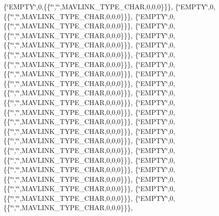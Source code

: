 \{\char`\"{}E\+M\+P\+TY\char`\"{},0,\{\{\char`\"{}\char`\"{},\char`\"{}\char`\"{},M\+A\+V\+L\+I\+N\+K\+\_\+\+T\+Y\+P\+E\+\_\+\+C\+H\+AR,0,0,0\}\}\}, \{\char`\"{}E\+M\+P\+TY\char`\"{},0,\{\{\char`\"{}\char`\"{},\char`\"{}\char`\"{},M\+A\+V\+L\+I\+N\+K\+\_\+\+T\+Y\+P\+E\+\_\+\+C\+H\+AR,0,0,0\}\}\}, \{\char`\"{}E\+M\+P\+TY\char`\"{},0,\{\{\char`\"{}\char`\"{},\char`\"{}\char`\"{},M\+A\+V\+L\+I\+N\+K\+\_\+\+T\+Y\+P\+E\+\_\+\+C\+H\+AR,0,0,0\}\}\}, \{\char`\"{}E\+M\+P\+TY\char`\"{},0,\{\{\char`\"{}\char`\"{},\char`\"{}\char`\"{},M\+A\+V\+L\+I\+N\+K\+\_\+\+T\+Y\+P\+E\+\_\+\+C\+H\+AR,0,0,0\}\}\}, \{\char`\"{}E\+M\+P\+TY\char`\"{},0,\{\{\char`\"{}\char`\"{},\char`\"{}\char`\"{},M\+A\+V\+L\+I\+N\+K\+\_\+\+T\+Y\+P\+E\+\_\+\+C\+H\+AR,0,0,0\}\}\}, \{\char`\"{}E\+M\+P\+TY\char`\"{},0,\{\{\char`\"{}\char`\"{},\char`\"{}\char`\"{},M\+A\+V\+L\+I\+N\+K\+\_\+\+T\+Y\+P\+E\+\_\+\+C\+H\+AR,0,0,0\}\}\}, \{\char`\"{}E\+M\+P\+TY\char`\"{},0,\{\{\char`\"{}\char`\"{},\char`\"{}\char`\"{},M\+A\+V\+L\+I\+N\+K\+\_\+\+T\+Y\+P\+E\+\_\+\+C\+H\+AR,0,0,0\}\}\}, \{\char`\"{}E\+M\+P\+TY\char`\"{},0,\{\{\char`\"{}\char`\"{},\char`\"{}\char`\"{},M\+A\+V\+L\+I\+N\+K\+\_\+\+T\+Y\+P\+E\+\_\+\+C\+H\+AR,0,0,0\}\}\}, \{\char`\"{}E\+M\+P\+TY\char`\"{},0,\{\{\char`\"{}\char`\"{},\char`\"{}\char`\"{},M\+A\+V\+L\+I\+N\+K\+\_\+\+T\+Y\+P\+E\+\_\+\+C\+H\+AR,0,0,0\}\}\}, \{\char`\"{}E\+M\+P\+TY\char`\"{},0,\{\{\char`\"{}\char`\"{},\char`\"{}\char`\"{},M\+A\+V\+L\+I\+N\+K\+\_\+\+T\+Y\+P\+E\+\_\+\+C\+H\+AR,0,0,0\}\}\}, \{\char`\"{}E\+M\+P\+TY\char`\"{},0,\{\{\char`\"{}\char`\"{},\char`\"{}\char`\"{},M\+A\+V\+L\+I\+N\+K\+\_\+\+T\+Y\+P\+E\+\_\+\+C\+H\+AR,0,0,0\}\}\}, \{\char`\"{}E\+M\+P\+TY\char`\"{},0,\{\{\char`\"{}\char`\"{},\char`\"{}\char`\"{},M\+A\+V\+L\+I\+N\+K\+\_\+\+T\+Y\+P\+E\+\_\+\+C\+H\+AR,0,0,0\}\}\}, \{\char`\"{}E\+M\+P\+TY\char`\"{},0,\{\{\char`\"{}\char`\"{},\char`\"{}\char`\"{},M\+A\+V\+L\+I\+N\+K\+\_\+\+T\+Y\+P\+E\+\_\+\+C\+H\+AR,0,0,0\}\}\}, \{\char`\"{}E\+M\+P\+TY\char`\"{},0,\{\{\char`\"{}\char`\"{},\char`\"{}\char`\"{},M\+A\+V\+L\+I\+N\+K\+\_\+\+T\+Y\+P\+E\+\_\+\+C\+H\+AR,0,0,0\}\}\}, \{\char`\"{}E\+M\+P\+TY\char`\"{},0,\{\{\char`\"{}\char`\"{},\char`\"{}\char`\"{},M\+A\+V\+L\+I\+N\+K\+\_\+\+T\+Y\+P\+E\+\_\+\+C\+H\+AR,0,0,0\}\}\}, \{\char`\"{}E\+M\+P\+TY\char`\"{},0,\{\{\char`\"{}\char`\"{},\char`\"{}\char`\"{},M\+A\+V\+L\+I\+N\+K\+\_\+\+T\+Y\+P\+E\+\_\+\+C\+H\+AR,0,0,0\}\}\}, \{\char`\"{}E\+M\+P\+TY\char`\"{},0,\{\{\char`\"{}\char`\"{},\char`\"{}\char`\"{},M\+A\+V\+L\+I\+N\+K\+\_\+\+T\+Y\+P\+E\+\_\+\+C\+H\+AR,0,0,0\}\}\}, \{\char`\"{}E\+M\+P\+TY\char`\"{},0,\{\{\char`\"{}\char`\"{},\char`\"{}\char`\"{},M\+A\+V\+L\+I\+N\+K\+\_\+\+T\+Y\+P\+E\+\_\+\+C\+H\+AR,0,0,0\}\}\}, \{\char`\"{}E\+M\+P\+TY\char`\"{},0,\{\{\char`\"{}\char`\"{},\char`\"{}\char`\"{},M\+A\+V\+L\+I\+N\+K\+\_\+\+T\+Y\+P\+E\+\_\+\+C\+H\+AR,0,0,0\}\}\}, \{\char`\"{}E\+M\+P\+TY\char`\"{},0,\{\{\char`\"{}\char`\"{},\char`\"{}\char`\"{},M\+A\+V\+L\+I\+N\+K\+\_\+\+T\+Y\+P\+E\+\_\+\+C\+H\+AR,0,0,0\}\}\}, \{\char`\"{}E\+M\+P\+TY\char`\"{},0,\{\{\char`\"{}\char`\"{},\char`\"{}\char`\"{},M\+A\+V\+L\+I\+N\+K\+\_\+\+T\+Y\+P\+E\+\_\+\+C\+H\+AR,0,0,0\}\}\}, \{\char`\"{}E\+M\+P\+TY\char`\"{},0,\{\{\char`\"{}\char`\"{},\char`\"{}\char`\"{},M\+A\+V\+L\+I\+N\+K\+\_\+\+T\+Y\+P\+E\+\_\+\+C\+H\+AR,0,0,0\}\}\}, 